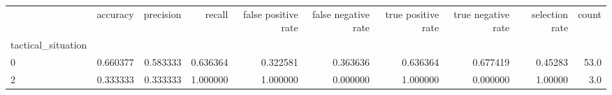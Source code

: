 \begin{tabular}{lrrrrrrrrr}
\toprule
{} &  accuracy &  precision &    recall &  false positive rate &  false negative rate &  true positive rate &  true negative rate &  selection rate &  count \\
tactical\_situation &           &            &           &                      &                      &                     &                     &                 &        \\
\midrule
0                  &  0.660377 &   0.583333 &  0.636364 &             0.322581 &             0.363636 &            0.636364 &            0.677419 &         0.45283 &   53.0 \\
2                  &  0.333333 &   0.333333 &  1.000000 &             1.000000 &             0.000000 &            1.000000 &            0.000000 &         1.00000 &    3.0 \\
\bottomrule
\end{tabular}
